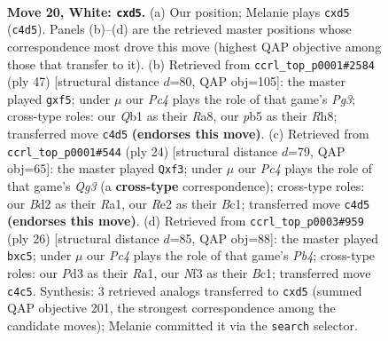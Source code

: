\documentclass[11pt]{article}
\begin{document}
\clearpage

\begin{figure}[p]\centering
\begin{subfigure}{0.46\textwidth}\centering
\resizebox{\linewidth}{!}{%
\newchessgame
\chessboard[
  setfen={1r1q1b2/n1p1rppk/p2p4/1p1bp2p/1PP1P3/P2P1N1P/3BRPP1/RQ3K2 w - - 0 20},
  showmover=false,
  pgfstyle=straightmove, color=movearrow, markmove={c4-d5}
]}
\caption{}
\end{subfigure}\hfill
\begin{subfigure}{0.46\textwidth}\centering
\resizebox{\linewidth}{!}{%
\newchessgame
\chessboard[
  setfen={r3kb1r/1q1n1p2/4p1p1/1p1pPB1p/p1pP4/2P4P/PPNB1PPK/R2Q1R2 b kq - 0 24},
  showmover=false,
  pgfstyle=straightmove, color=movearrow, markmove={g6-f5}
]}
\caption{}
\end{subfigure}
\\[4pt]
\begin{subfigure}{0.46\textwidth}\centering
\resizebox{\linewidth}{!}{%
\newchessgame
\chessboard[
  setfen={r3k1nr/3qp1bp/p2p2p1/1pp1Pp2/5P2/2NP1bQP/PPP3P1/R1B2RK1 w kq - 0 13},
  showmover=false,
  pgfstyle=straightmove, color=movearrow, markmove={g3-f3}
]}
\caption{}
\end{subfigure}\hfill
\begin{subfigure}{0.46\textwidth}\centering
\resizebox{\linewidth}{!}{%
\newchessgame
\chessboard[
  setfen={r2q2k1/p1pn1r1p/1pp2pp1/2b1p3/PPb1P3/2PP1N2/5PPP/R1BQ1RK1 w - - 0 14},
  showmover=false,
  pgfstyle=straightmove, color=movearrow, markmove={b4-c5}
]}
\caption{}
\end{subfigure}
\caption{\textbf{Move 20, White: \texttt{cxd5}.} (a) Our position; Melanie plays \texttt{cxd5} (\texttt{c4d5}). Panels (b)--(d) are the retrieved master positions whose correspondence most drove this move (highest QAP objective among those that transfer to it). (b) Retrieved from \texttt{ccrl\_top\_p0001\#2584} (ply 47) [structural distance $d$=80, QAP obj=105]: the master played \texttt{gxf5}; under $\mu$ our \emph{Pc4} plays the role of that game's \emph{Pg3}; cross-type roles: our \emph{Q}b1 as their \emph{R}a8, our \emph{p}b5 as their \emph{R}h8; transferred move \texttt{c4d5} \textbf{(endorses this move)}. (c) Retrieved from \texttt{ccrl\_top\_p0001\#544} (ply 24) [structural distance $d$=79, QAP obj=65]: the master played \texttt{Qxf3}; under $\mu$ our \emph{Pc4} plays the role of that game's \emph{Qg3} (a \textbf{cross-type} correspondence); cross-type roles: our \emph{B}d2 as their \emph{R}a1, our \emph{R}e2 as their \emph{B}c1; transferred move \texttt{c4d5} \textbf{(endorses this move)}. (d) Retrieved from \texttt{ccrl\_top\_p0003\#959} (ply 26) [structural distance $d$=85, QAP obj=88]: the master played \texttt{bxc5}; under $\mu$ our \emph{Pc4} plays the role of that game's \emph{Pb4}; cross-type roles: our \emph{P}d3 as their \emph{R}a1, our \emph{N}f3 as their \emph{B}c1; transferred move \texttt{c4c5}. Synthesis: 3 retrieved analogs transferred to \texttt{cxd5} (summed QAP objective 201, the strongest correspondence among the candidate moves); Melanie committed it via the \texttt{search} selector.}
\label{fig:thought-m38}
\end{figure}
\end{document}
